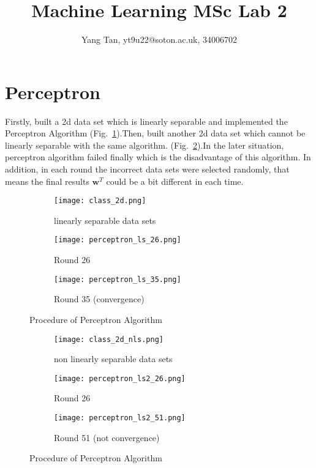 \documentclass[11pt]{article}
\title {Machine Learning MSc Lab 2}
\author{Yang Tan, yt9u22@soton.ac.uk, 34006702}
\begin{document}
\maketitle
\section{Perceptron}
Firstly, built a 2d data set which is linearly separable and implemented the Perceptron Algorithm (Fig.~\ref{fig:f1}).Then, built another 2d data set which cannot be linearly separable with the same algorithm. (Fig.~\ref{fig:f2}).In the later situation, perceptron algorithm failed finally which is the disadvantage of this algorithm. In addition, in each round the incorrect data sets were selected randomly, that means the final results $\bm{w}^T$ could be a bit different in each time. 


\begin{figure}[h]
\centering
\begin{subfigure}{0.3\textwidth}
\texttt{[image: class\_2d.png]}
\caption{linearly separable data sets}
\end{subfigure}
\begin{subfigure}{0.3\textwidth}
\texttt{[image: perceptron\_ls\_26.png]}
\caption{Round 26}
\end{subfigure}
\begin{subfigure}{0.3\textwidth}
\texttt{[image: perceptron\_ls\_35.png]}
\caption{Round 35 (convergence)}
\end{subfigure}
\caption{Procedure of Perceptron Algorithm}
\label{fig:f1}
\end{figure}


\begin{figure}[h]
\centering
\begin{subfigure}{0.3\textwidth}
\texttt{[image: class\_2d\_nls.png]}
\caption{non linearly separable data sets}
\end{subfigure}
\begin{subfigure}{0.3\textwidth}
\texttt{[image: perceptron\_ls2\_26.png]}
\caption{Round 26  }
\end{subfigure}
\begin{subfigure}{0.3\textwidth}
\texttt{[image: perceptron\_ls2\_51.png]}
\caption{Round 51 (not convergence)}
\end{subfigure}
\caption{Procedure of Perceptron Algorithm}
\label{fig:f2}
\end{figure}
\end{document}
